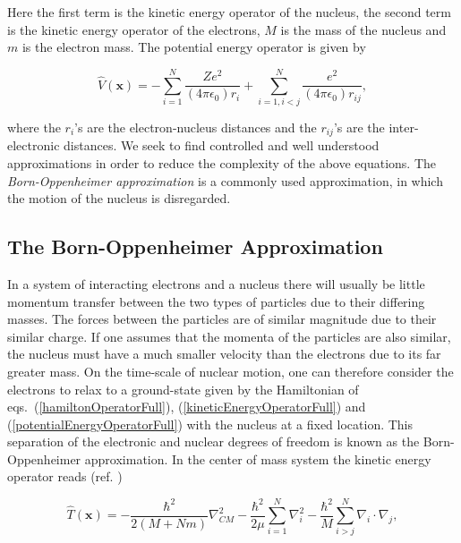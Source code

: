 Here the first term is the kinetic energy operator of the nucleus,
the second term is the kinetic energy operator of the electrons,
$M$ is the mass of the nucleus and $m$ is the electron mass. The
potential energy operator is given by

\begin{equation}
  \hat{V}(\mathbf{x}) = 
  - \sum_{i=1}^{N} \frac{Ze^2}{(4\pi \epsilon_0)r_i}
  + \sum_{i=1,i<j}^{N} \frac{e^2}{(4\pi \epsilon_0)r_{ij}},
\label{potentialEnergyOperatorFull}
\end{equation}

where the $r_i$'s are the electron-nucleus distances and the
$r_{ij}$'s are the inter-electronic distances. 
\newline
%
\newline
We seek to find controlled and well understood approximations in order
to reduce the complexity of the above equations. The
\emph{Born-Oppenheimer approximation} is a commonly used
approximation, in which the motion of the nucleus is disregarded.


\subsection{The Born-Oppenheimer Approximation}

In a system of interacting electrons and a nucleus there will usually
be little momentum transfer between the two types of particles due to
their differing masses. The forces between the particles are 
of similar magnitude due to their similar charge. If one assumes
that the momenta of the particles are also similar, the nucleus
must have a much smaller velocity than the electrons due to its far
greater mass. On the time-scale of nuclear motion, one can therefore
consider the electrons to relax to a ground-state given by the
Hamiltonian of eqs.~(\ref{hamiltonOperatorFull}),
(\ref{kineticEnergyOperatorFull}) and
(\ref{potentialEnergyOperatorFull}) with the nucleus at a fixed
location. This separation of the electronic and nuclear degrees of
freedom is known as the Born-Oppenheimer approximation. 
\newline
%
\newline
In the center of mass system the
kinetic energy operator reads (ref. \cite{bransden1983})

\begin{equation}
  \hat{T}(\mathbf{x}) = -\frac{\hbar^2}{2(M+Nm)}\nabla^2_{CM}
  -\frac{\hbar^2}{2\mu}\sum_{i=1}^{N}\nabla^2_i
  -\frac{\hbar^2}{M}\sum_{i>j}^{N}\nabla_i\cdot\nabla_j,
  \label{centerOfMassKineticEnergyOperator}
\end{equation}

